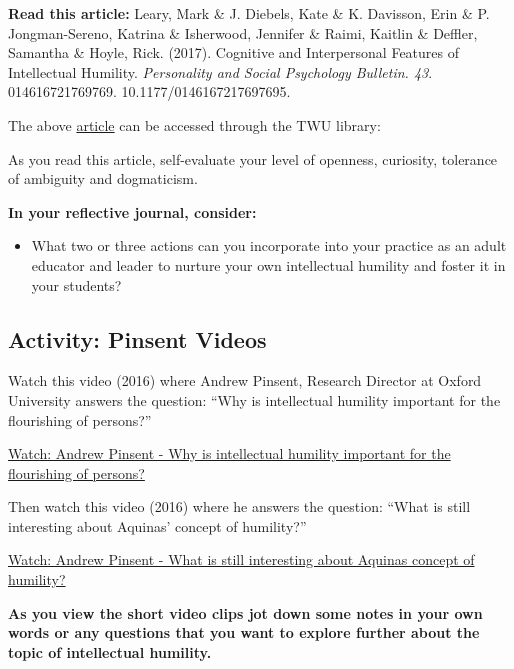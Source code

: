 \documentclass[
]{book}
\providecommand{\tightlist}{%
  \setlength{\itemsep}{0pt}\setlength{\parskip}{0pt}}
\begin{document}
\begin{reflect}
\textbf{Read this article:} Leary, Mark \& J. Diebels, Kate \& K.
Davisson, Erin \& P. Jongman-Sereno, Katrina \& Isherwood, Jennifer \&
Raimi, Kaitlin \& Deffler, Samantha \& Hoyle, Rick. (2017). Cognitive
and Interpersonal Features of Intellectual Humility. \emph{Personality
and Social Psychology Bulletin. 43}. 014616721769769.
10.1177/0146167217697695.

The above
\href{https://journals-sagepub-com.ezproxy.student.twu.ca/doi/pdf/10.1177/0146167217697695?}{article}
can be accessed through the TWU library:

As you read this article, self-evaluate your level of openness,
curiosity, tolerance of ambiguity and dogmaticism.

\textbf{In your reflective journal, consider:}

\begin{itemize}
\tightlist
\item
  What two or three actions can you incorporate into your practice as an
  adult educator and leader to nurture your own intellectual humility
  and foster it in your students?
\end{itemize}
\end{reflect}

\hypertarget{activity-pinsent-videos}{%
\subsection*{Activity: Pinsent Videos}\label{activity-pinsent-videos}}

\begin{reflect}
Watch this video (2016) where Andrew Pinsent, Research Director at
Oxford University answers the question: ``Why is intellectual humility
important for the flourishing of persons?''

\href{https://www.youtube.com/watch?v=ny5m64sjm14}{Watch: Andrew Pinsent
- Why is intellectual humility important for the flourishing of
persons?}

Then watch this video (2016) where he answers the question: ``What is
still interesting about Aquinas' concept of humility?''

\href{https://www.youtube.com/watch?v=j25KL5qw_tY}{Watch: Andrew Pinsent
- What is still interesting about Aquinas concept of humility?}

\textbf{As you view the short video clips jot down some notes in your
own words or any questions that you want to explore further about the
topic of intellectual humility.}
\end{reflect}
\end{document}
